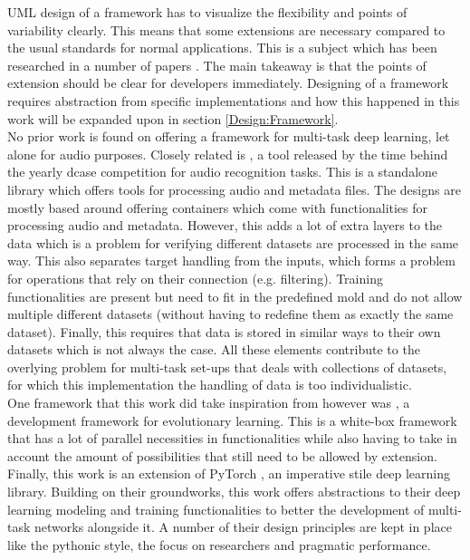 UML design of a framework has to visualize the flexibility and points of variability clearly. This means that some extensions are necessary compared to the usual standards for normal applications. This is a subject which has been researched in a number of papers \citep{bouassida2001uml} \citep{ben2004uml}. The main takeaway is that the points of extension should be clear for developers immediately. Designing of a framework requires abstraction from specific implementations and how this happened in this work will be expanded upon in section \ref{Design:Framework}. \\

No prior work is found on offering a framework for multi-task deep learning, let alone for audio purposes. Closely related is \cite{dcaserepo2021}, a tool released by the time behind the yearly dcase \cite{dcase} competition for audio recognition tasks. This is a standalone library which offers tools for processing audio and metadata files. The designs are mostly based around offering containers which come with functionalities for processing audio and metadata. However, this adds a lot of extra layers to the data which is a problem for verifying different datasets are processed in the same way. This also separates target handling from the inputs, which forms a problem for operations that rely on their connection (e.g. filtering). Training functionalities are present but need to fit in the predefined mold and do not allow multiple different datasets (without having to redefine them as exactly the same dataset). Finally, this requires that data is stored in similar ways to their own datasets which is not always the case. All these elements contribute to the overlying problem for multi-task set-ups that deals with collections of datasets, for which this implementation the handling of data is too individualistic. \\

One framework that this work did take inspiration from however was \cite{de2012deap}, a development framework for evolutionary learning. This is a white-box framework that has a lot of parallel necessities in functionalities while also having to take in account the amount of possibilities that still need to be allowed by extension.\\

Finally, this work is an extension of PyTorch \citep{paszke2019pytorch}, an imperative stile deep learning library. Building on their groundworks, this work offers abstractions to their deep learning modeling and training functionalities to better the development of multi-task networks alongside it. A number of their design principles are kept in place like the pythonic style, the focus on researchers and pragmatic performance.\\


